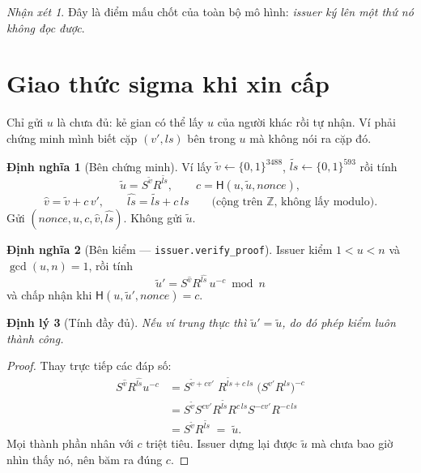 \documentclass[a4paper,11pt]{article}
\theoremstyle{definition}
\newtheorem{definition}{Định nghĩa}[section]
\theoremstyle{plain}
\newtheorem{theorem}[definition]{Định lý}
\theoremstyle{remark}
\newtheorem*{remark}{Nhận xét}
\newcommand{\Hash}{\mathsf{H}}
\begin{document}
\begin{remark}
Đây là điểm mấu chốt của toàn bộ mô hình: \emph{issuer ký lên một thứ nó không đọc được}.
\end{remark}

\section{Giao thức sigma khi xin cấp}

Chỉ gửi $u$ là chưa đủ: kẻ gian có thể lấy $u$ của người khác rồi tự nhận. Ví phải chứng
minh mình biết cặp $(v',\mathit{ls})$ bên trong $u$ mà không nói ra cặp đó.

\begin{definition}[Bên chứng minh]
Ví lấy $\tilde v\leftarrow\{0,1\}^{3488}$,
$\widetilde{\mathit{ls}}\leftarrow\{0,1\}^{593}$ rồi tính
\[
\tilde u = S^{\tilde v} R^{\widetilde{\mathit{ls}}},\qquad
c=\Hash(u,\tilde u,\mathit{nonce}),
\]
\[
\hat v = \tilde v + c\,v' ,\qquad
\widehat{\mathit{ls}} = \widetilde{\mathit{ls}} + c\,\mathit{ls}
\qquad\text{(cộng trên }\mathbb{Z}\text{, không lấy modulo).}
\]
Gửi $(\mathit{nonce},u,c,\hat v,\widehat{\mathit{ls}})$. Không gửi $\tilde u$.
\end{definition}

\begin{definition}[Bên kiểm --- \texttt{issuer.verify\_proof}]
Issuer kiểm $1<u<n$ và $\gcd(u,n)=1$, rồi tính
\[
\tilde u' = S^{\hat v} R^{\widehat{\mathit{ls}}}\, u^{-c} \bmod n
\]
và chấp nhận khi $\Hash(u,\tilde u',\mathit{nonce})=c$.
\end{definition}

\begin{theorem}[Tính đầy đủ]
Nếu ví trung thực thì $\tilde u' = \tilde u$, do đó phép kiểm luôn thành công.
\end{theorem}

\begin{proof}
Thay trực tiếp các đáp số:
\begin{align*}
S^{\hat v} R^{\widehat{\mathit{ls}}} u^{-c}
&= S^{\tilde v + c v'}\; R^{\widetilde{\mathit{ls}} + c\,\mathit{ls}}\;
   \bigl(S^{v'}R^{\mathit{ls}}\bigr)^{-c} \\
&= S^{\tilde v} S^{c v'} R^{\widetilde{\mathit{ls}}} R^{c\,\mathit{ls}}
   S^{-c v'} R^{-c\,\mathit{ls}} \\
&= S^{\tilde v} R^{\widetilde{\mathit{ls}}} \;=\; \tilde u .
\end{align*}
Mọi thành phần nhân với $c$ triệt tiêu. Issuer dựng lại được $\tilde u$ mà chưa bao giờ
nhìn thấy nó, nên băm ra đúng $c$.
\end{proof}
\end{document}
